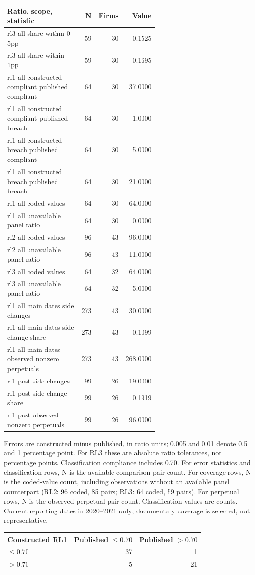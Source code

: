 \begin{table}[!htbp]\centering\scriptsize
\begin{tabular}{p{0.61\linewidth}rrr}
\toprule
Ratio, scope, statistic & N & Firms & Value \\
\midrule
rl3 all share within 0 5pp & 59 & 30 & 0.1525 \\
rl3 all share within 1pp & 59 & 30 & 0.1695 \\
rl1 all constructed compliant published compliant & 64 & 30 & 37.0000 \\
rl1 all constructed compliant published breach & 64 & 30 & 1.0000 \\
rl1 all constructed breach published compliant & 64 & 30 & 5.0000 \\
rl1 all constructed breach published breach & 64 & 30 & 21.0000 \\
rl1 all coded values & 64 & 30 & 64.0000 \\
rl1 all unavailable panel ratio & 64 & 30 & 0.0000 \\
rl2 all coded values & 96 & 43 & 96.0000 \\
rl2 all unavailable panel ratio & 96 & 43 & 11.0000 \\
rl3 all coded values & 64 & 32 & 64.0000 \\
rl3 all unavailable panel ratio & 64 & 32 & 5.0000 \\
rl1 all main dates side changes & 273 & 43 & 30.0000 \\
rl1 all main dates side change share & 273 & 43 & 0.1099 \\
rl1 all main dates observed nonzero perpetuals & 273 & 43 & 268.0000 \\
rl1 post side changes & 99 & 26 & 19.0000 \\
rl1 post side change share & 99 & 26 & 0.1919 \\
rl1 post observed nonzero perpetuals & 99 & 26 & 96.0000 \\
\bottomrule
\end{tabular}
\par\smallskip\parbox{0.95\linewidth}{\footnotesize Errors are constructed minus published, in ratio units; 0.005 and 0.01 denote 0.5 and 1 percentage point. For RL3 these are absolute ratio tolerances, not percentage points. Classification compliance includes 0.70. For error statistics and classification rows, N is the available comparison-pair count. For coverage rows, N is the coded-value count, including observations without an available panel counterpart (RL2: 96 coded, 85 pairs; RL3: 64 coded, 59 pairs). For perpetual rows, N is the observed-perpetual pair count. Classification values are counts. Current reporting dates in 2020--2021 only; documentary coverage is selected, not representative.}
\end{table}

\begin{table}[!htbp]\centering\small
\begin{tabular}{lrr}\toprule
Constructed RL1 & Published $\leq 0.70$ & Published $>0.70$ \\
\midrule
$\leq 0.70$ & 37 & 1 \\
$>0.70$ & 5 & 21 \\
\bottomrule\end{tabular}\end{table}